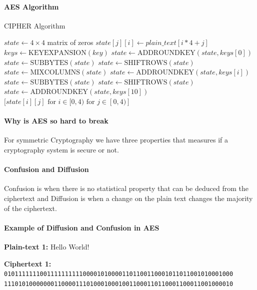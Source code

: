 \paragraph{AES Algorithm}\cite{nist_aes}
\begin{algorithm}[H]
\caption{CIPHER Algorithm}
\begin{algorithmic}[1]
    \State $state \gets 4 \times 4$ matrix of zeros
    \For{$i \in [0, 4)$}
        \For{$j \in [0, 4)$}
                \State $state[j][i] \gets plain\_text[i*4+j]$
            \EndIf
        \EndFor
    \EndFor
    \State $keys \gets \text{KEYEXPANSION}(key)$
    \State $state \gets \text{ADDROUNDKEY}(state, keys[0])$
    \For{$i \in [1, 10)$}
        \State $state \gets \text{SUBBYTES}(state)$
        \State $state \gets \text{SHIFTROWS}(state)$
        \State $state \gets \text{MIXCOLUMNS}(state)$
        \State $state \gets \text{ADDROUNDKEY}(state, keys[i])$
    \EndFor
    \State $state \gets \text{SUBBYTES}(state)$
    \State $state \gets \text{SHIFTROWS}(state)$
    \State $state \gets \text{ADDROUNDKEY}(state, keys[10])$
    \State \Return $[state[i][j] \text{ for } i \in [0, 4) \text{ for } j \in [0, 4)]$
\EndProcedure
\end{algorithmic}
\end{algorithm}

\paragraph{Why is AES so hard to break}
For symmetric Cryptography we have three properties that measures if a cryptography system is secure or not.
\paragraph{Confusion and Diffusion}\cite{ramet_r3.09}
Confusion is when there is no statistical property that can be deduced from the ciphertext and Diffusion is when a change on the plain text changes the majority of the ciphertext.

\paragraph*{Example of Diffusion and Confusion in AES}

\textbf{Plain-text 1:} Hello World!

\textbf{Ciphertext 1:} \\
{\small\texttt{0101111111001111111111000010100001101100110001011011001010001000\\1110101000000011000011101000100010011000110110001100011001000010}}

